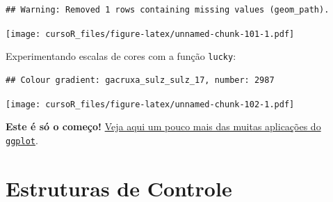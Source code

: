 \documentclass[]{book}
\newenvironment{Shaded}{\begin{snugshade}}{\end{snugshade}}
\newcommand{\KeywordTok}[1]{\textcolor[rgb]{0.13,0.29,0.53}{\textbf{#1}}}
\newcommand{\DataTypeTok}[1]{\textcolor[rgb]{0.13,0.29,0.53}{#1}}
\newcommand{\StringTok}[1]{\textcolor[rgb]{0.31,0.60,0.02}{#1}}
\newcommand{\CommentTok}[1]{\textcolor[rgb]{0.56,0.35,0.01}{\textit{#1}}}
\newcommand{\OperatorTok}[1]{\textcolor[rgb]{0.81,0.36,0.00}{\textbf{#1}}}
\newcommand{\NormalTok}[1]{#1}
\theoremstyle{definition}
\theoremstyle{definition}
\theoremstyle{definition}
\theoremstyle{remark}
\begin{document}
\begin{verbatim}
## Warning: Removed 1 rows containing missing values (geom_path).
\end{verbatim}

\texttt{[image: cursoR\_files/figure-latex/unnamed-chunk-101-1.pdf]}

Experimentando escalas de cores com a função \texttt{lucky}:

\begin{Shaded}
\end{Shaded}

\begin{verbatim}
## Colour gradient: gacruxa_sulz_sulz_17, number: 2987
\end{verbatim}

\texttt{[image: cursoR\_files/figure-latex/unnamed-chunk-102-1.pdf]}

\textbf{Este é só o começo!}
\href{http://r-statistics.co/Top50-Ggplot2-Visualizations-MasterList-R-Code.html}{Veja
aqui um pouco mais das muitas aplicações do \texttt{ggplot}}.

\chapter{Estruturas de Controle}\label{loop}
\end{document}
